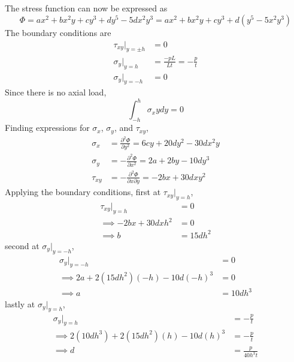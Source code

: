 \subsection{}
The stress function can now be expressed as
\begin{equation*}
    \Phi = ax^2 + bx^2y + cy^3 + dy^5 - 5dx^2y^3 = ax^2 + bx^2y + cy^3 + d(y^5-5x^2y^3)
\end{equation*}
The boundary conditions are
\begin{align*}
    \tau_{xy}|_{y=\pm h} &= 0 \\
    \sigma_y|_{y=h} &= \frac{-pL}{Lt} = -\frac{p}{t} \\
    \sigma_y|_{y=-h} &= 0
\end{align*}
Since there is no axial load,
\begin{equation*}
    \int_{-h}^{h} \sigma_x y dy = 0
\end{equation*}
Finding expressions for $\sigma_x$, $\sigma_y$, and $\tau_{xy}$,
\begin{align*}
    \sigma_x &= \frac{\partial^2 \Phi}{\partial y^2} = 6cy + 20dy^2 - 30dx^2y \\
    \sigma_y &= -\frac{\partial^2 \Phi}{\partial x^2} = 2a + 2by - 10dy^3 \\
    \tau_{xy} &= -\frac{\partial^2 \Phi}{\partial x \partial y} = -2bx + 30dxy^2
\end{align*}
Applying the boundary conditions, first at $\tau_{xy}|_{y=h}$,
\begin{align*}
    \tau_{xy}|_{y=h} &= 0 \\
    \implies -2bx + 30dxh^2 &= 0 \\
    \implies b &= 15dh^2
\end{align*}
second at $\sigma_y|_{y=-h}$,
\begin{align*}
    \sigma_y|_{y=-h} &= 0 \\
    \implies 2a + 2(15dh^2)(-h) - 10d(-h)^3 &= 0 \\
    \implies a &= 10dh^3 
\end{align*}
lastly at $\sigma_y|_{y=h}$,
\begin{align*}
    \sigma_y|_{y=h} &= -\frac{p}{t} \\
    \implies 2(10dh^3) + 2(15dh^2)(h) - 10d(h)^3 &= -\frac{p}{t} \\
    \implies d &= \frac{p}{40h^3 t}
\end{align*}




